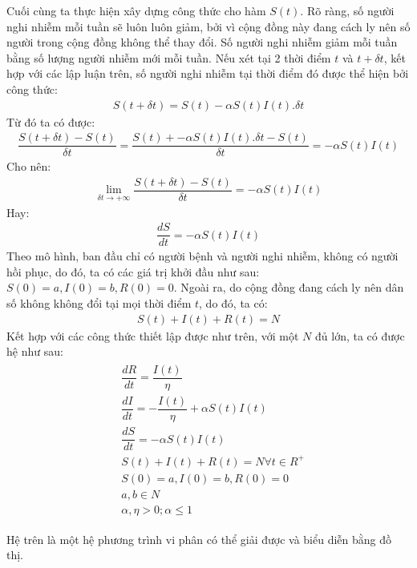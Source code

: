 \documentclass[a4paper]{article}
\begin{document}
Cuối cùng ta thực hiện xây dựng công thức cho hàm $S(t)$. Rõ ràng, số người nghi nhiễm mỗi tuần sẽ luôn luôn giảm, bởi vì cộng đồng này đang cách ly nên số người trong cộng đồng không thể thay đổi. Số người nghi nhiễm giảm mỗi tuần bằng số lượng người nhiễm mới mỗi tuần. Nếu xét tại 2 thời điểm $t$ và $t+\delta t$, kết hợp với các lập luận trên, số người nghi nhiễm tại thời điểm đó được thể hiện bởi công thức: 
\begin{align*}
    S(t+ \delta t)=S(t)-\alpha S(t)I(t).\delta t
\end{align*}
Từ đó ta có được: 
\begin{align*}
    \dfrac{S(t+\delta t)-S(t)}{\delta t} =\dfrac {S(t) + -\alpha S(t)I(t).\delta t - S(t) }{\delta t} = -\alpha S(t)I(t)
\end{align*}
Cho nên:
\begin{align*}
    \lim_{\delta t\rightarrow +\infty}\dfrac{S(t+\delta t)-S(t)}{\delta t} = -\alpha S(t)I(t)
\end{align*}
Hay: 
\begin{align*}
    \dfrac{dS}{dt} = -\alpha S(t)I(t)
\end{align*}
Theo mô hình, ban đầu chỉ có người bệnh và người nghi nhiễm, không có người hồi phục, do đó, ta có các giá trị khởi đầu như sau: $S(0)=a, I(0)=b, R(0)=0$. Ngoài ra, do cộng đồng đang cách ly nên dân số không không đổi tại mọi thời điểm $t$, do đó, ta có:
\begin{align*}
    S(t) + I(t) + R(t) = N
\end{align*}
Kết hợp với các công thức thiết lập được như trên, với một $N$ đủ lớn, ta có được hệ như sau:
\label{equations: 2}
\begin{align}
    \begin{split}
        & \dfrac{dR}{dt} = \dfrac{I(t)}{\eta} \\
        & \dfrac{dI}{dt} = - \dfrac{I(t)}{\eta} +  \alpha S(t)I(t) \\
        & \dfrac{dS}{dt} = -\alpha S(t)I(t) \\
        & S(t) + I(t) + R(t) = N  \forall t \in R^{+} \\
        & S(0)=a, I(0)=b, R(0)=0 \\
        & a, b \in N \\
        & \alpha, \eta > 0; \alpha \leq 1
    \end{split}
\end{align}

Hệ trên là một hệ phương trình vi phân có thể giải được và biểu diễn bằng đồ thị.
\end{document}
